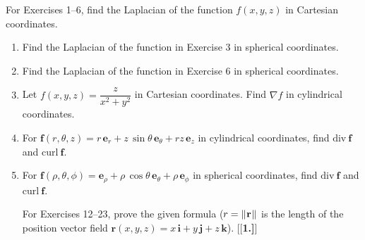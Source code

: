 \par\noindent For Exercises 1--6, find the Laplacian of the function $f(x,y,z)$ in Cartesian coordinates.
\begin{enumerate}[\bfseries 1.]
 \item Find the Laplacian of the function in Exercise 3 in spherical coordinates.
 \item Find the Laplacian of the function in Exercise 6 in spherical coordinates.
 \item Let $f(x,y,z) = \dfrac{z}{x^2 + y^2}$ in Cartesian coordinates. Find $\nabla f$ in cylindrical coordinates.
 \item For $\textbf{f}(r,\theta,z) = r\,\textbf{e}_{r} + z\,\sin\theta\,\textbf{e}_{\theta} + rz\,\textbf{e}_{z}$ in
  cylindrical coordinates, find $\text{div}~\textbf{f}$ and $\text{curl}~\textbf{f}$.
 \item For $\textbf{f}(\rho,\theta,\phi) = \textbf{e}_{\rho} + \rho\,\cos\theta\,\textbf{e}_{\theta} +
  \rho\,\textbf{e}_{\phi}$ in spherical coordinates, find $\text{div}~\textbf{f}$ and $\text{curl}~\textbf{f}$.
\par\noindent For Exercises 12--23, prove the given formula ($r = \lVert\mspace{1mu}\textbf{r}\mspace{1mu}\rVert$ is the length of the position
vector field $\textbf{r}(x,y,z) = x\,\textbf{i} + y\,\textbf{j} +z\,\textbf{k}$).
[{[\bfseries 1.]}]
\end{enumerate}
